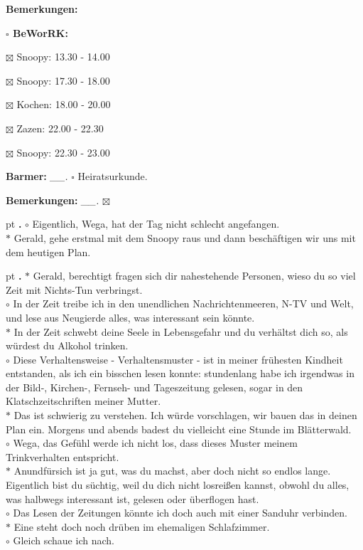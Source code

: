 \documentclass[10pt,a4paper]{article}
\newcounter{notec}
\newcommand\notep[1]{%
  \stepcounter{notec}
  \vskip #1pt
  {\bf\arabic{notec}.}
}
\newcommand\prop[1] {{\color {alizarin} {\bf #1}}}             %
\newcommand\opti[1] {{\color {amethyst} {\bf #1}}}             %
\newcommand\mand[1] {{\color {burntorange} {\bf #1}}}          %
\newcommand\bottomspace{\vskip 4pt}
\newcommand\n[1] { {\sl #1.} \hskip 5pt }
\begin{document}
\begin{mdframed}[style=daystyle]
\begin{labeling}{{\mand {Bemerkungen:}}}
\begin{minipage}{0.75\textwidth}
\begin{labeling}{\prop {$\square$ { BeWorRK:}}}
      \item[$\boxtimes$ Snoopy:]  13.30 - 14.00
        
      \item[$\boxtimes$ Snoopy:]  17.30 - 18.00
      \item[$\boxtimes$ Kochen:]  18.00 - 20.00
        
      \item[$\boxtimes$ Zazen:]   22.00 - 22.30
      \item[$\boxtimes$ Snoopy:]  22.30 - 23.00
      \end{labeling}
    \end{minipage}
    \bottomspace
  \item[{\opti {Barmer:}}]       \n{\_\_} $\square$ Heiratsurkunde.
  \item[{\mand {Bemerkungen:}}]  \n{\_\_} $\boxtimes$
  \end{labeling}
    
  \setcounter{notec}{0}
  
  \notep 0 $\circ$ Eigentlich, Wega, hat der Tag nicht schlecht angefangen. \\
  $\ast$ Gerald, gehe erstmal mit dem Snoopy raus und dann beschäftigen wir uns
  mit dem heutigen Plan.

  \notep 4 $\ast$ Gerald, berechtigt fragen sich dir nahestehende Personen,
  wieso du so viel Zeit mit Nichts-Tun verbringst. \\
  $\circ$ In der Zeit treibe ich in den unendlichen Nachrichtenmeeren, N-TV und
  Welt, und lese aus Neugierde alles, was interessant sein könnte. \\
  $\ast$ In der Zeit schwebt deine Seele in Lebensgefahr und du verhältst dich
  so, als würdest du Alkohol trinken. \\
  $\circ$ Diese Verhaltensweise - Verhaltensmuster - ist in meiner frühesten
  Kindheit entstanden, als ich ein bisschen lesen konnte: stundenlang habe ich
  irgendwas in der Bild-, Kirchen-, Fernseh- und Tageszeitung gelesen, sogar in
  den Klatschzeitschriften meiner Mutter. \\
  $\ast$ Das ist schwierig zu verstehen. Ich würde vorschlagen, wir bauen das in
  deinen Plan ein. Morgens und abends badest du vielleicht eine Stunde
  im Blätterwald. \\
  $\circ$ Wega, das Gefühl werde ich nicht los, dass dieses Muster meinem
  Trinkverhalten entspricht. \\
  $\ast$ Anundfürsich ist ja gut, was du machst, aber doch nicht so endlos
  lange. Eigentlich bist du süchtig, weil du dich nicht losreißen kannst,
  obwohl du alles, was halbwegs interessant ist, gelesen oder überflogen hast. \\
  $\circ$ Das Lesen der Zeitungen könnte ich doch auch mit einer Sanduhr
  verbinden. \\
  $\ast$ Eine steht doch noch drüben im ehemaligen Schlafzimmer. \\
  $\circ$ Gleich schaue ich nach.



\end{mdframed}
\end{document}
